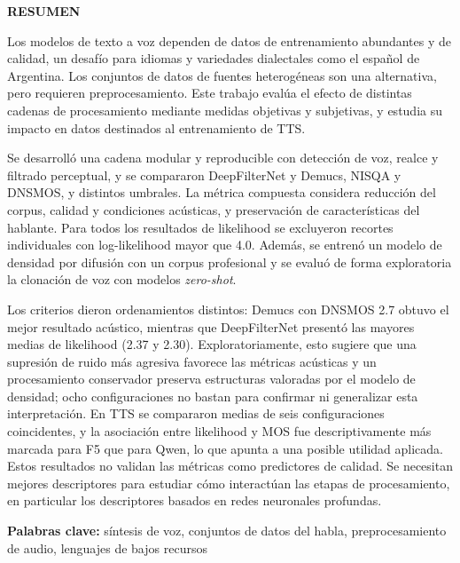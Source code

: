 \begin{centering}
\Large{\textbf{RESUMEN}}

\end{centering}

Los modelos de texto a voz dependen de datos de entrenamiento abundantes y de calidad, un desafío para idiomas y variedades dialectales como el español de Argentina. Los conjuntos de datos de fuentes heterogéneas son una alternativa, pero requieren preprocesamiento. Este trabajo evalúa el efecto de distintas cadenas de procesamiento mediante medidas objetivas y subjetivas, y estudia su impacto en datos destinados al entrenamiento de TTS.

Se desarrolló una cadena modular y reproducible con detección de voz, realce y filtrado perceptual, y se compararon DeepFilterNet y Demucs, NISQA y DNSMOS, y distintos umbrales. La métrica compuesta considera reducción del corpus, calidad y condiciones acústicas, y preservación de características del hablante. Para todos los resultados de likelihood se excluyeron recortes individuales con log-likelihood mayor que 4.0. Además, se entrenó un modelo de densidad por difusión con un corpus profesional y se evaluó de forma exploratoria la clonación de voz con modelos \textit{zero-shot}.

Los criterios dieron ordenamientos distintos: Demucs con DNSMOS 2.7 obtuvo el mejor resultado acústico, mientras que DeepFilterNet presentó las mayores medias de likelihood (2.37 y 2.30). Exploratoriamente, esto sugiere que una supresión de ruido más agresiva favorece las métricas acústicas y un procesamiento conservador preserva estructuras valoradas por el modelo de densidad; ocho configuraciones no bastan para confirmar ni generalizar esta interpretación. En TTS se compararon medias de seis configuraciones coincidentes, y la asociación entre likelihood y MOS fue descriptivamente más marcada para F5 que para Qwen, lo que apunta a una posible utilidad aplicada. Estos resultados no validan las métricas como predictores de calidad. Se necesitan mejores descriptores para estudiar cómo interactúan las etapas de procesamiento, en particular los descriptores basados en redes neuronales profundas.


\noindent\textbf{Palabras clave:} síntesis de voz, conjuntos de datos del habla, preprocesamiento de audio, lenguajes de bajos recursos
